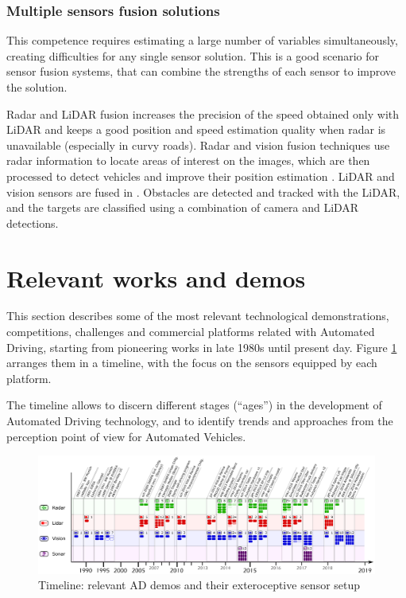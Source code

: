 \documentclass[journal]{IEEEtran}
\begin{document}

\subsubsection{Multiple sensors fusion solutions}
This competence requires estimating a large number of variables simultaneously,
creating difficulties for any single sensor solution. This is a good scenario
for sensor fusion systems, that can combine the strengths of each sensor to
improve the solution. 

Radar and LiDAR fusion \cite{gohring2011radar} increases the precision of 
the speed obtained only with LiDAR and keeps a good position and speed 
estimation quality when radar is unavailable (especially in curvy roads).
Radar and vision fusion techniques use radar information to locate areas of 
interest on the images, which are then processed to detect vehicles and improve 
their position estimation \cite{alessandretti2007vehicle}.
LiDAR and vision sensors are fused in \cite{premebida2007lidar}. Obstacles
are detected and tracked with the LiDAR, and the targets are classified using
a combination of camera and LiDAR detections.

\section{Relevant works and demos}
\label{sec:04-relevantdemos}
This section describes some of the most relevant technological demonstrations, 
competitions, challenges and commercial platforms related with Automated 
Driving, starting from pioneering works in late 1980s until present day. Figure 
\ref{fig:tech-demos} arranges them in a timeline, with the focus on the sensors 
equipped by each platform.

The timeline allows to discern different stages (``ages'') in the development 
of Automated Driving technology, and to identify trends and approaches from the 
perception point of view for Automated Vehicles.

\begin{figure}[p] %
	\includegraphics[width=0.95\textheight,angle=90,keepaspectratio]{"fig3"}%
	\caption{Timeline: relevant AD demos and their exteroceptive sensor 
		setup}
	\label{fig:tech-demos}
\end{figure}
\end{document}
